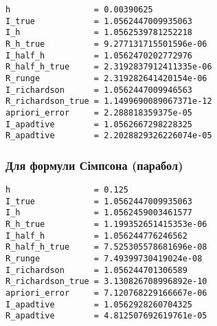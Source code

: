 \begin{verbatim}
h                 = 0.00390625
I_true            = 1.0562447009935063
I_h               = 1.0562539781252218
R_h_true          = 9.277131715501596e-06
I_half_h          = 1.0562470202772976
R_half_h_true     = 2.3192837912411335e-06
R_runge           = 2.319282641420154e-06
I_richardson      = 1.0562447009946563
R_richardson_true = 1.1499690089067371e-12
apriori_error     = 2.288818359375e-05
I_apadtive        = 1.0562667298228325
R_apadtive        = 2.2028829326226074e-05
\end{verbatim}

\subsubsection{Для формули Сімпсона (парабол)}

\begin{verbatim}
h                 = 0.125
I_true            = 1.0562447009935063
I_h               = 1.0562459003461577
R_h_true          = 1.199352651415353e-06
I_half_h          = 1.056244776246562
R_half_h_true     = 7.525305578681696e-08
R_runge           = 7.49399730419024e-08
I_richardson      = 1.056244701306589
R_richardson_true = 3.130826708996892e-10
apriori_error     = 7.120768229166667e-06
I_apadtive        = 1.0562928260704325
R_apadtive        = 4.812507692619761e-05
\end{verbatim}


